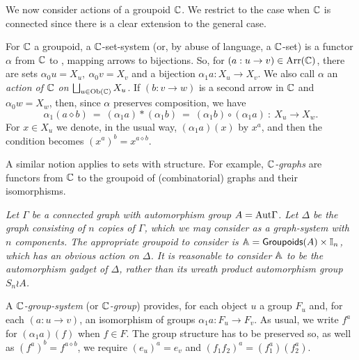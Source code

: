 \bigskip
We now consider actions of a groupoid $\mathbb{C}$. 
We restrict to the case when $\mathbb{C}$ is connected 
since there is a clear extension to the general case. 

For $\mathbb{C}$ a groupoid, a $\mathbb{C}$-set-system 
(or, by abuse of language, a $\mathbb{C}$-set) 
is a functor $\alpha$  from $\mathbb{C}$ to \catSet, mapping arrows to bijections.  
So, for $(a : u \to v) \in \mathrm{Arr}(\mathbb{C})$, there are sets 
$\alpha_0u = X_u,~ \alpha_0v = X_v$ 
and a bijection $\alpha_1a : X_u \to X_v$.  
We also call $\alpha$ an 
\emph{action of $\mathbb{C}$ on $\bigsqcup_{u \in \mathrm{Ob}(\mathbb{C})}X_u$}. 
If $(b : v \to w)$ is a second arrow in $\mathbb{C}$ and $\alpha_0w = X_w$,
then, since $\alpha$ preserves composition, we have 
$$
\alpha_1(a \diamond b) ~=~ (\alpha_1a)*(\alpha_1b) 
                       ~=~ (\alpha_1b)\circ(\alpha_1a) ~:~ X_u \to X_w.
$$
For $x \in X_u$ we denote, in the usual way, $(\alpha_1a)(x)$ by $x^a$, 
and then the condition becomes $(x^a)^b = x^{a \diamond b}$. 

\begin{figure}[htbp]
\begin{center}

\label{figure:gpd-sets}
\end{center}
\end{figure}

A similar notion applies to sets with structure. 
For example, \emph{$\mathbb{C}$-graphs} are functors from $\mathbb{C}$ to the groupoid 
of (combinatorial) graphs and their isomorphisms. 

\begin{example}
\emph{
Let $\Gamma$ be a connected graph with automorphism group $A=\mathrm{Aut}\Gamma$. 
Let $\Delta$ be the graph consisting of $n$ copies of $\Gamma$, 
which we may consider as a \emph{graph-system} with $n$ components. 
The appropriate groupoid to consider is $\mathbb{A} = {\sf Groupoids}(A)\times\mathbb{I}_n$, 
which has an obvious action on $\Delta$. 
It is reasonable to consider $\mathbb{A}$ to be 
the automorphism gadget of $\Delta$, 
rather than its wreath product automorphism group $S_n \wr A$. 
}\end{example}

A \emph{$\mathbb{C}$-group-system} (or \emph{$\mathbb{C}$-group}) provides, 
for each object $u$ a group $F_u$ and, for each $(a : u \to v)$, 
an isomorphism of groups  $\alpha_1a : F_u \to F_v$. 
As usual, we write $f^a$ for $(\alpha_1a)(f)$ when $f \in F$. 
The group structure has to be preserved so, 
as well as  $(f^a)^b = f^{a \diamond b}$, 
we require $(e_u)^a = e_v$ and $(f_1f_2)^a = (f_1^a)(f_2^a)$. 

